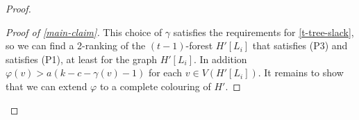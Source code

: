 \documentclass[kpfonts]{patmorin}
\theoremstyle{named}
\begin{document}
\begin{proof}
\begin{proof}[Proof of \cref{main-claim}]
       This choice of $\gamma$ satisfies the requirements for \cref{t-tree-slack}, so we can find a 2-ranking of the $(t-1)$-forest $H'[L_i]$ that satisfies (P3) and satisfies (P1), at least for the graph $H'[L_i]$. In addition $\varphi(v)> a(k-c-\gamma(v)-1)$ for each $v\in V(H'[L_i])$.  It remains to show that we can extend $\varphi$ to a complete colouring of $H'$.


\end{proof}
\end{proof}
\end{document}
